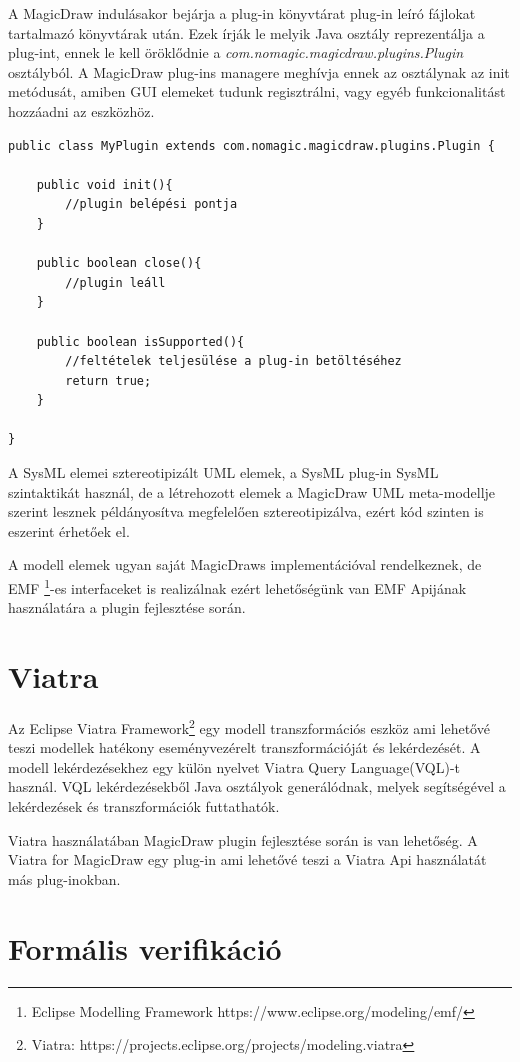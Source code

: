 A MagicDraw indulásakor bejárja a plug-in könyvtárat plug-in leíró fájlokat tartalmazó könyvtárak után. Ezek írják le melyik Java osztály reprezentálja a plug-int, ennek le kell öröklődnie a \emph{com.nomagic.magicdraw.plugins.Plugin} osztályból. A MagicDraw plug-ins managere meghívja ennek az osztálynak az init metódusát, amiben GUI elemeket tudunk regisztrálni, vagy egyéb funkcionalitást hozzáadni az eszközhöz.

\lstset{style=javacode}
\begin{lstlisting}
public class MyPlugin extends com.nomagic.magicdraw.plugins.Plugin {

	public void init(){
		//plugin belépési pontja
	}
	
	public boolean close(){
		//plugin leáll
	}
	
	public boolean isSupported(){
		//feltételek teljesülése a plug-in betöltéséhez
		return true;
	}
	
}
\end{lstlisting}

A SysML elemei sztereotipizált UML elemek, a SysML plug-in SysML szintaktikát használ, de a létrehozott elemek a MagicDraw UML meta-modellje szerint lesznek példányosítva megfelelően sztereotipizálva, ezért kód szinten is eszerint érhetőek el.

A modell elemek ugyan saját MagicDraws implementációval rendelkeznek, de EMF \footnote{Eclipse Modelling Framework https://www.eclipse.org/modeling/emf/}-es interfaceket is realizálnak ezért lehetőségünk van EMF Apijának használatára a plugin fejlesztése során.

\section{Viatra}

Az Eclipse Viatra Framework\footnote{Viatra: https://projects.eclipse.org/projects/modeling.viatra} egy modell transzformációs eszköz ami lehetővé teszi modellek hatékony eseményvezérelt transzformációját és lekérdezését. A modell lekérdezésekhez egy külön nyelvet Viatra Query Language(VQL)-t használ. VQL lekérdezésekből Java osztályok generálódnak, melyek segítségével a lekérdezések és transzformációk futtathatók.

Viatra használatában MagicDraw plugin fejlesztése során is van lehetőség. A Viatra for MagicDraw egy plug-in ami lehetővé teszi a Viatra Api használatát más plug-inokban. 

\section{Formális verifikáció}

